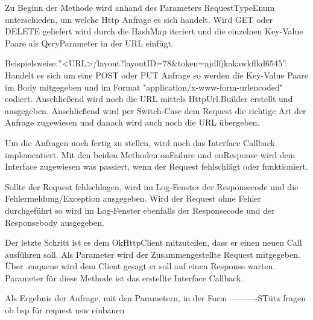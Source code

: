 Zu Beginn der Methode wird anhand des Parameters RequestTypeEnum unterschieden, um welche Http Anfrage es sich handelt. Wird GET oder DELETE geliefert wird durch die HashMap iteriert und die einzelnen Key-Value Paare als QeryParameter in der URL einfügt.

Beispielsweise:''<URL>/layout?layoutID=78&token=ajdlfjkakawkflkd6545''.
Handelt es sich um eine POST oder PUT Anfrage so werden die Key-Value Paare im Body mitgegeben und im Format "application/x-www-form-urlencoded" codiert. Anschließend wird noch die URL mittels HttpUrl.Builder erstellt und ausgegeben. 
Anschließend wird per Switch-Case dem Request die richtige Art der Anfrage zugewiesen und danach wird auch noch die URL übergeben. 

Um die Anfragen noch fertig zu stellen, wird noch das Interface Callback implementiert. Mit den beiden Methoden onFailure und onResponse wird dem Interface zugewiesen was passiert, wenn der Request fehlschlägt oder funktioniert. 

Sollte der Request fehlschlagen, wird im Log-Fenster der Responsecode und die Fehlermeldung/Exception ausgegeben. 
Wird der Request ohne Fehler durchgeführt so wird im Log-Fenster ebenfalls der Responsecode und der Responsebody ausgegeben.

Der letzte Schritt ist es dem OkHttpClient mitzuteilen, dass er einen neuen Call ausführen soll. Als Parameter wird der Zusammengestellte Request mitgegeben. Über .enqueue wird dem Client gesagt er soll auf einen Response warten. Parameter für diese Methode ist das erstellte Interface Callback.
\cite{OkHttp3}





Als Ergebnis der Anfrage, mit den Parametern, in der Form
----------STütz fragen ob bsp für request usw einbauen



